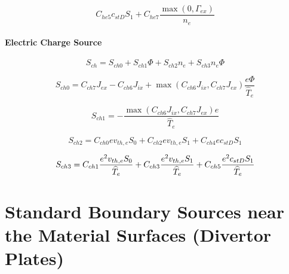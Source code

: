 \documentclass[11pt]{article}
\begin{document}
\begin{equation}
C_{he5}c_{stD}S_{1}+C_{he7}\frac{\max\left( 0,\Gamma_{ex}\right) }{n_{e}} 
\label{107}
\end{equation}

\bigskip

\paragraph{Electric Charge Source}

\begin{equation}
S_{ch}=S_{ch0}+S_{ch1}\Phi+S_{ch2}n_{e}+S_{ch3}n_{e}\Phi   \label{108}
\end{equation}

\begin{equation}
S_{ch0}=C_{ch7}J_{ex}-C_{ch6}J_{ix}+\max\left(
C_{ch6}J_{ix},C_{ch7}J_{ex}\right) \frac{e\Phi}{\widehat{T}_{e}} 
\label{109}
\end{equation}
\bigskip

\begin{equation}
S_{ch1}=-\frac{\max\left( C_{ch6}J_{ix},C_{ch7}J_{ex}\right) e}{\widehat
{T}_{e}}   \label{110}
\end{equation}

\begin{equation}
S_{ch2}=C_{ch0}ev_{th,e}S_{0}+C_{ch2}ev_{th,e}S_{1}+C_{ch4}ec_{stD}S_{1} 
\label{111}
\end{equation}

\begin{equation}
S_{ch3}=C_{ch1}\frac{e^{2}v_{th,e}S_{0}}{\widehat{T}_{e}}+C_{ch3}\frac
{e^{2}v_{th,e}S_{1}}{\widehat{T}_{e}}+C_{ch5}\frac{e^{2}c_{stD}S_{1}}{%
\widehat{T}_{e}}   \label{112}
\end{equation}

\bigskip

\bigskip

\section{Standard Boundary Sources near the Material Surfaces (Divertor
Plates)}
\end{document}

